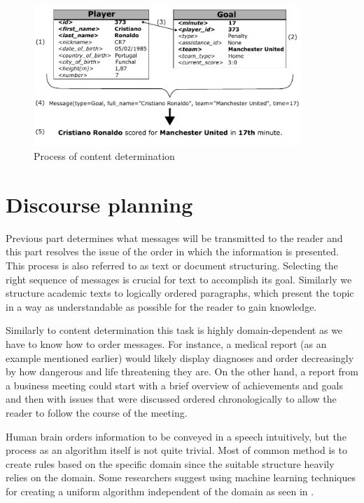 \begin{figure}[h]
	\centerline{\includegraphics[width=0.9\textwidth]{../img/content_determination.pdf}}
	\caption{Process of content determination}
	\label{fig:cd}
\end{figure}

\section{Discourse planning}
Previous part determines what messages will be transmitted to the reader and this part resolves the issue of the order in which the information is presented. This process is also referred to as text or document structuring. Selecting the right sequence of messages is crucial for text to accomplish its goal. Similarly we structure academic texts to logically ordered paragraphs, which present the topic in a way as understandable as possible for the reader to gain knowledge.

Similarly to content determination this task is highly domain-dependent as we have to know how to order messages. For instance, a medical report (as an example mentioned earlier) would likely display diagnoses and order decreasingly by how dangerous and life threatening they are. On the other hand, a report from a business meeting could start with a brief overview of achievements and goals and then with issues that were discussed ordered chronologically to allow the reader to follow the course of the meeting.

Human brain orders information to be conveyed in a speech intuitively, but the process as an algorithm itself is not quite trivial. Most of common method is to create rules based on the specific domain since the suitable structure heavily relies on the domain. Some researchers suggest using machine learning techniques for creating a  uniform algorithm independent of the domain as seen in \cite{dimitromanolaki2003learning}.

